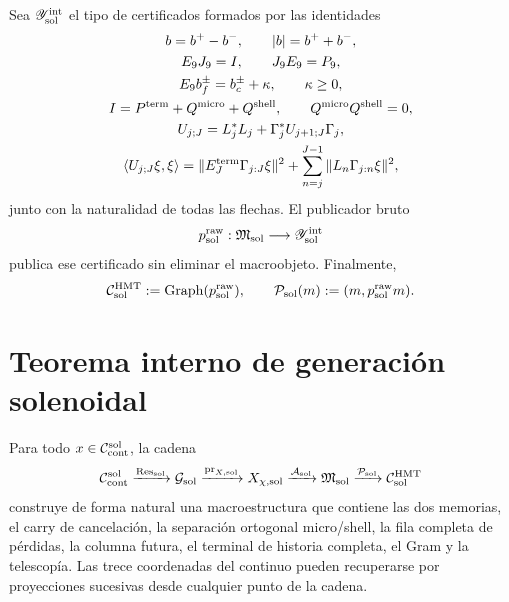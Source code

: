 Sea \(\mathscr Y_{\rm sol}^{\rm int}\) el tipo de certificados formados por
las identidades
\begin{equation}\label{eq:pdfv2-sol-certificate-list}
 \begin{gathered}
 b=b^+-b^-,\qquad |b|=b^++b^-,\\
 E_9J_9=I,\qquad J_9E_9=P_9,\\
 E_9b_f^\pm=b_c^\pm+\kappa,\qquad\kappa\geq0,\\
 I=P^{\rm term}+Q^{\rm micro}+Q^{\rm shell},
 \qquad Q^{\rm micro}Q^{\rm shell}=0,\\
 U_{j;J}=L_j^*L_j+\Gamma_j^*U_{j+1;J}\Gamma_j,\\
 \langle U_{j;J}\xi,\xi\rangle
 =\|E_J^{\rm term}\Gamma_{j:J}\xi\|^2
  +\sum_{n=j}^{J-1}\|L_n\Gamma_{j:n}\xi\|^2,
 \end{gathered}
\end{equation}
junto con la naturalidad de todas las flechas.  El publicador bruto
\begin{equation}\label{eq:pdfv2-sol-publisher}
 p_{\rm sol}^{\rm raw}:\mathfrak M_{\rm sol}
 \longrightarrow\mathscr Y_{\rm sol}^{\rm int}
\end{equation}
publica ese certificado sin eliminar el macroobjeto.  Finalmente,
\begin{equation}\label{eq:pdfv2-sol-output-graph}
 \mathcal C_{\rm sol}^{\rm HMT}
 :=\operatorname{Graph}(p_{\rm sol}^{\rm raw}),
 \qquad
 \mathcal P_{\rm sol}(m):=(m,p_{\rm sol}^{\rm raw}m).
\end{equation}

\section{Teorema interno de generación solenoidal}
\label{sec:pdfv2-sol-theorem}

\begin{theorem}
\label{thm:pdfv2-sol-internal-generation}
Para todo \(x\in\mathcal C_{\rm cont}^{\rm sol}\), la cadena
\[
 \mathcal C_{\rm cont}^{\rm sol}
 \xrightarrow{\operatorname{Res}_{\rm sol}}
 \mathcal G_{\rm sol}
 \xrightarrow{\operatorname{pr}_{X,{\rm sol}}}
 X_{\chi,{\rm sol}}
 \xrightarrow{\mathcal A_{\rm sol}}
 \mathfrak M_{\rm sol}
 \xrightarrow{\mathcal P_{\rm sol}}
 \mathcal C_{\rm sol}^{\rm HMT}
\]
construye de forma natural una macroestructura que contiene las dos memorias,
el carry de cancelación, la separación ortogonal micro/shell, la fila completa
de pérdidas, la columna futura, el terminal de historia completa, el Gram y la
telescopía.  Las trece coordenadas del continuo pueden recuperarse por
proyecciones sucesivas desde cualquier punto de la cadena.
\end{theorem}

